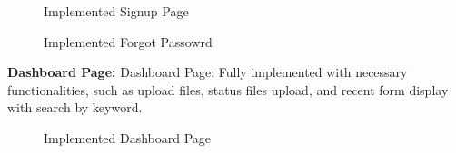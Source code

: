 \documentclass[12pt,oneside,openright,a4paper]{cpe-english-project}
\begin{document}
\begin{figure}[H]
\centering
{}
\caption{Implemented Signup Page}\label{fig:auth-signup}
\end{figure}

\begin{figure}[H]
\centering
{}
\caption{Implemented Forgot Passowrd}\label{fig:auth-forgotpasswd}
\end{figure}

\textbf{Dashboard Page:} Dashboard Page: Fully implemented with necessary functionalities,  such as upload files, status files upload, and recent form display with search by keyword.

\begin{figure}[H]
\centering
{}
\caption{Implemented Dashboard Page}\label{fig:dashboard-result}
\end{figure}
\end{document}
